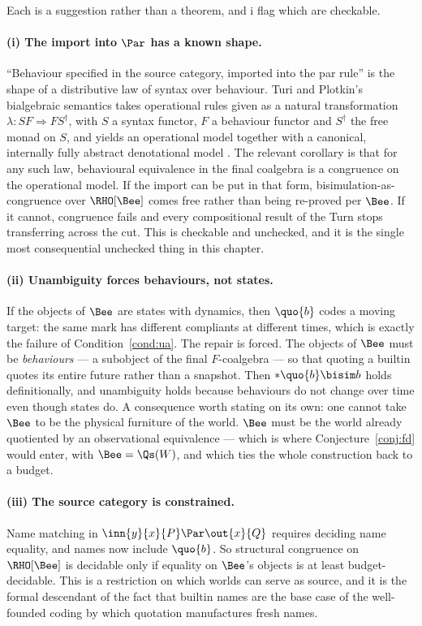 Each is a suggestion rather than a theorem, and i flag which are
checkable.

\paragraph{(i) The import into $\Par$ has a known shape.}
``Behaviour specified in the source category, imported into the par
rule'' is the shape of a distributive law of syntax over behaviour.
Turi and Plotkin's bialgebraic semantics takes operational rules
given as a natural transformation $\lambda : SF \Rightarrow
FS^{\dagger}$, with $S$ a syntax functor, $F$ a behaviour functor
and $S^{\dagger}$ the free monad on $S$, and yields an operational
model together with a canonical, internally fully abstract
denotational model \cite{turiplotkin}.
The relevant corollary is that for any such law, behavioural
equivalence in the final coalgebra is a congruence on the
operational model.
If the import can be put in that form, bisimulation-as-congruence
over $\RHO[\Bee]$ comes free rather than being re-proved per
$\Bee$.
If it cannot, congruence fails and every compositional result of
the Turn stops transferring across the cut.
This is checkable and unchecked, and it is the single most
consequential unchecked thing in this chapter.

\paragraph{(ii) Unambiguity forces behaviours, not states.}
If the objects of $\Bee$ are states with dynamics, then $\quo{b}$
codes a moving target: the same mark has different compliants at
different times, which is exactly the failure of
Condition~\ref{cond:ua}.
The repair is forced.
The objects of $\Bee$ must be \emph{behaviours} --- a subobject of
the final $F$-coalgebra --- so that quoting a builtin quotes its
entire future rather than a snapshot.
Then $*\quo{b} \bisim b$ holds definitionally, and unambiguity
holds because behaviours do not change over time even though states
do.
A consequence worth stating on its own: one cannot take $\Bee$ to
be the physical furniture of the world.
$\Bee$ must be the world already quotiented by an observational
equivalence --- which is where Conjecture~\ref{conj:fd} would
enter, with $\Bee = \Qs(W)$, and which ties the whole construction
back to a budget.

\paragraph{(iii) The source category is constrained.}
Name matching in $\inn{y}{x}{P} \Par \out{x}{Q}$ requires deciding
name equality, and names now include $\quo{b}$.
So structural congruence on $\RHO[\Bee]$ is decidable only if
equality on $\Bee$'s objects is at least budget-decidable.
This is a restriction on which worlds can serve as source, and it
is the formal descendant of the fact that builtin names are the
base case of the well-founded coding by which quotation
manufactures fresh names.

